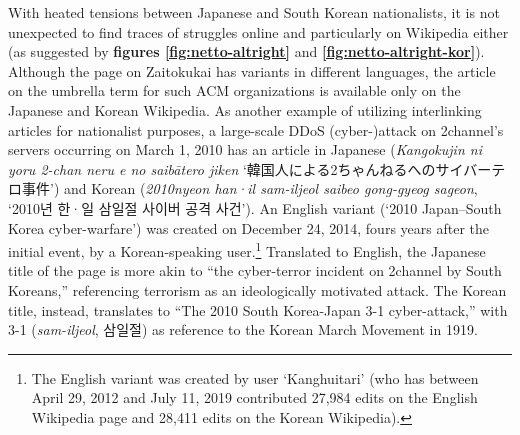 \documentclass[10pt,british,A4paper,twoside]{memoir}
\begin{document}
With heated tensions between Japanese and South Korean nationalists, it
is not unexpected to find traces of struggles online and particularly on Wikipedia
either (as suggested by \textbf{figures \ref{fig:netto-altright}} and
\textbf{\ref{fig:netto-altright-kor}}). Although the page on Zaitokukai
has variants in different languages, the article on the umbrella term
for such ACM organizations is available
only on the Japanese and Korean Wikipedia. As another example of utilizing
interlinking articles for nationalist purposes, a large-scale DDoS
(cyber-)attack on 2channel's servers occurring on March 1, 2010 has an
article in Japanese (\emph{Kangokujin ni yoru 2-chan neru e no saibātero
jiken} `韓国人による2ちゃんねるへのサイバーテロ事件') and Korean
(\emph{2010nyeon han·il sam-iljeol saibeo gong-gyeog sageon}, `2010년
한·일 삼일절 사이버 공격 사건'). An English variant (`2010 Japan--South
Korea cyber-warfare') was created on December 24, 2014, fours years after
the initial event, by a Korean-speaking user.\footnote{The English
  variant was created by user `Kanghuitari' (who has between April 29,
  2012 and July 11, 2019 contributed 27,984 edits on the English
  Wikipedia page and 28,411 edits on the Korean Wikipedia).} Translated
to English, the Japanese title of the page is more akin to ``the
cyber-terror incident on 2channel by South Koreans,'' referencing terrorism as an ideologically motivated attack. The Korean
title, instead, translates to ``The 2010 South Korea-Japan 3-1
cyber-attack,'' with 3-1 (\emph{sam-iljeol}, 삼일절) as reference to the Korean March  Movement in 1919.
\end{document}
